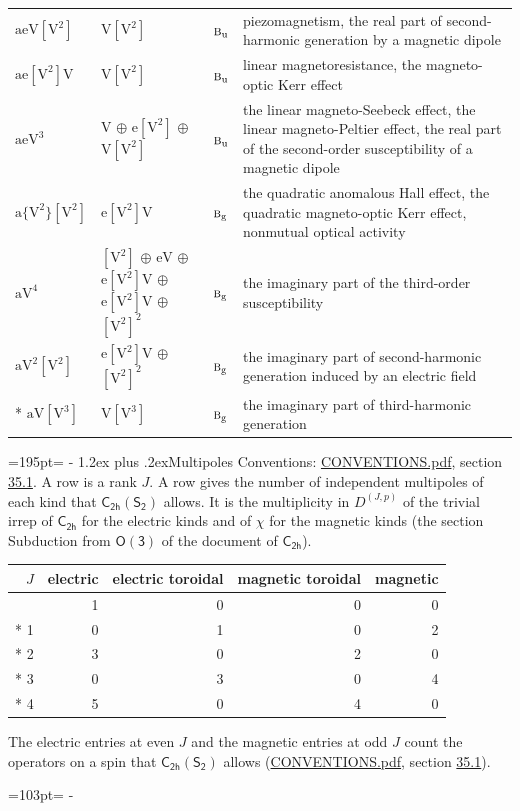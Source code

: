\documentclass[10pt,a4paper]{article}
\makeatletter
\renewcommand\section{\@startsection{section}{1}{\z@}{-3ex plus -1ex minus -.2ex}%
  {1.2ex plus .2ex}{\normalfont\large\sffamily\bfseries\color{parttitle}}}
\newcommand{\needspace}[1]{\par\penalty-100\begingroup\dimen0=#1\relax\dimen2=\pagegoal
  \advance\dimen2-\pagetotal\ifdim\dimen0>\dimen2\relax\ifdim\dimen2>0pt\vfil\break\fi\fi
  \endgroup}
\numberwithin{equation}{section}
\newcommand{\grp}[1]{\mathsf{#1}}
\newcommand{\irr}[1]{\text{\normalfont\scshape #1}}
\newcommand{\ptag}[1]{\mathrm{#1}}
\newcommand{\irrJp}[2]{D^{(#1,#2)}}
\newcommand{\jahn}[1]{\mathrm{#1}}
\newlength{\fillwidth}\newlength{\cellwidth}\newlength{\colwidth}
\makeatother
\begin{document}
{\begin{longtable}{@{}lll>{\RaggedRight\arraybackslash}p{\fillwidth}@{}}
$\jahn{aeV[V^{2}]}$ & $\jahn{V[V^{2}]}$ & $\irr{b}_{\ptag{u}}$ & piezomagnetism, the real part of second-harmonic generation by a magnetic dipole\\
$\jahn{ae[V^{2}]V}$ & $\jahn{V[V^{2}]}$ & $\irr{b}_{\ptag{u}}$ & linear magnetoresistance, the magneto-optic Kerr effect\\
$\jahn{aeV^{3}}$ & $\jahn{V}$ $\oplus$ $\jahn{e[V^{2}]}$ $\oplus$ $\jahn{V[V^{2}]}$ & $\irr{b}_{\ptag{u}}$ & the linear magneto-Seebeck effect, the linear magneto-Peltier effect, the real part of the second-order susceptibility of a magnetic dipole\\
$\jahn{a\{V^{2}\}[V^{2}]}$ & $\jahn{e[V^{2}]V}$ & $\irr{b}_{\ptag{g}}$ & the quadratic anomalous Hall effect, the quadratic magneto-optic Kerr effect, nonmutual optical activity\\
$\jahn{aV^{4}}$ & $\jahn{[V^{2}]}$ $\oplus$ $\jahn{eV}$ $\oplus$ $\jahn{e[V^{2}]V}$ $\oplus$ $\jahn{e[V^{2}]V}$ $\oplus$ $\jahn{[V^{2}]^{2}}$ & $\irr{b}_{\ptag{g}}$ & the imaginary part of the third-order susceptibility\\
$\jahn{aV^{2}[V^{2}]}$ & $\jahn{e[V^{2}]V}$ $\oplus$ $\jahn{[V^{2}]^{2}}$ & $\irr{b}_{\ptag{g}}$ & the imaginary part of second-harmonic generation induced by an electric field\\*
$\jahn{aV[V^{3}]}$ & $\jahn{V[V^{3}]}$ & $\irr{b}_{\ptag{g}}$ & the imaginary part of third-harmonic generation\\
\bottomrule\end{longtable}}
\needspace{195pt}
\section{Multipoles}\label{s:multipoles}
Conventions: \href{../../CONVENTIONS.pdf}{CONVENTIONS.pdf}, section \href{../../CONVENTIONS.pdf\#conv.35.1}{35.1}.
A row is a rank $J$. \label{n:head.multipole.electric}\label{n:head.multipole.electric.toroidal}\label{n:head.multipole.magnetic.toroidal}\label{n:head.multipole.magnetic}A row gives the number of independent multipoles of each kind that $\grp{C_{2h}}(\grp{S_{2}})$ allows. It is the multiplicity in $\irrJp{J}{p}$ of the trivial irrep of $\grp{C_{2h}}$ for the electric kinds and of $\chi$ for the magnetic kinds (the section Subduction from $\grp{O(3)}$ of the document of \href{../../../rotation/data/pdf/C2h.pdf}{$\grp{C_{2h}}$}).
{\small\begin{longtable}{@{}rrrrr@{}}\toprule
$J$ & electric & electric toroidal & magnetic toroidal & magnetic\\\midrule\endhead
\bottomrule\endfoot\endlastfoot
0 & 1 & 0 & 0 & 0\\*
1 & 0 & 1 & 0 & 2\\*
2 & 3 & 0 & 2 & 0\\*
3 & 0 & 3 & 0 & 4\\*
4 & 5 & 0 & 4 & 0\\
\bottomrule\end{longtable}}
The electric entries at even $J$ and the magnetic entries at odd $J$ count the operators on a spin that $\grp{C_{2h}}(\grp{S_{2}})$ allows (\href{../../CONVENTIONS.pdf}{CONVENTIONS.pdf}, section \href{../../CONVENTIONS.pdf\#conv.35.1}{35.1}).
\needspace{103pt}
\end{document}
